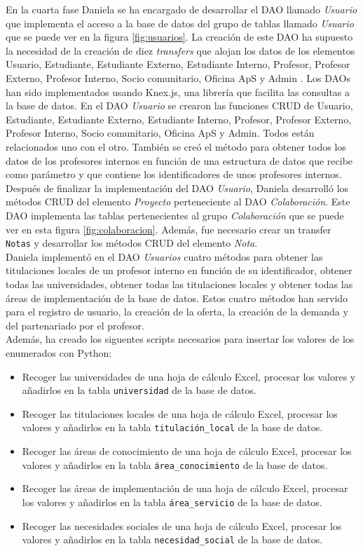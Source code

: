 \documentclass[11pt]{book}
\begin{document}
En la cuarta fase Daniela se ha encargado de desarrollar el DAO llamado \textit{Usuario} que implementa el acceso a la base de datos del grupo de tablas llamado \textit{Usuario} que se puede ver en la figura \ref{fig:usuarios}. La creación de este DAO ha supuesto la necesidad de la creación de diez \textit{transfers} que alojan los datos de los elementos Usuario, Estudiante, Estudiante Externo, Estudiante Interno, Profesor, Profesor Externo, Profesor Interno, Socio comunitario, Oficina ApS y Admin . Los DAOs han sido implementados usando Knex.js, una librería que facilita las consultas a la base de datos. En el DAO \textit{Usuario} se crearon las funciones CRUD de Usuario, Estudiante, Estudiante Externo, Estudiante Interno, Profesor, Profesor Externo, Profesor Interno, Socio comunitario, Oficina ApS y Admin. Todos están relacionados uno con el otro. También se creó el método para obtener todos los datos de los profesores internos en función de una estructura de datos que recibe como parámetro y que contiene los identificadores de unos profesores internos.\\
Después de finalizar la implementación del DAO \textit{Usuario}, Daniela desarrolló los métodos CRUD del elemento \textit{Proyecto} perteneciente al DAO \textit{Colaboración}. Este DAO implementa las tablas pertenecientes al grupo \textit{Colaboración} que se puede ver en esta figura \ref{fig:colaboracion}. Además, fue necesario crear un transfer \texttt{Notas} y desarrollar los métodos CRUD del elemento \textit{Nota}.\\
 Daniela implementó en el DAO \textit{Usuarios} cuatro métodos para obtener las titulaciones locales de un profesor interno en función de su identificador, obtener todas las universidades, obtener todas las titulaciones locales y obtener todas las áreas de implementación de la base de datos. Estos cuatro métodos han servido para el registro de usuario, la creación de la oferta, la creación de la demanda y del partenariado por el profesor.\\
  Además, ha creado los siguentes scripts necesarios para insertar los valores de los enumerados con Python:
\begin{itemize} 
	\item Recoger las universidades de una hoja de cálculo Excel, procesar los valores y añadirlos en la tabla \texttt{universidad} de la base de datos.
	\item Recoger las titulaciones locales de una hoja de cálculo Excel, procesar los valores y añadirlos en la tabla \texttt{titulación\_local} de la base de datos.
	\item Recoger las áreas de conocimiento de una hoja de cálculo Excel, procesar los valores y añadirlos en la tabla \texttt{área\_conocimiento} de la base de datos.
	\item Recoger las áreas de implementación de una hoja de cálculo Excel, procesar los valores y añadirlos en la tabla \texttt{área\_servicio} de la base de datos.
	\item Recoger las necesidades sociales de una hoja de cálculo Excel, procesar los valores y añadirlos en la tabla \texttt{necesidad\_social} de la base de datos.\\
\end{itemize}
\end{document}
